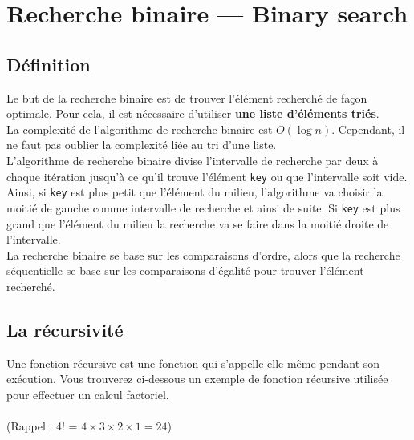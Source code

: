     \section{Recherche binaire — Binary search}
    
    \subsection{Définition}
    
    Le but de la recherche binaire est de trouver l'élément recherché de façon optimale. Pour cela, il est nécessaire d'utiliser \textbf{une liste d'éléments triés}.\\
    
    La complexité de l'algorithme de recherche binaire est $O(\log n)$. Cependant, il ne faut pas oublier la complexité liée au tri d'une liste.\\
    
    L'algorithme de recherche binaire divise l'intervalle de recherche par deux à chaque itération jusqu'à ce qu'il trouve l'élément \lstinline{key} ou que l'intervalle soit vide.\\
    
    Ainsi, si \lstinline{key} est plus petit que l'élément du milieu, l'algorithme va choisir la moitié de gauche comme intervalle de recherche et ainsi de suite. Si \lstinline{key} est plus grand que l'élément du milieu la recherche va se faire dans la moitié droite de l'intervalle.\\
    
    La recherche binaire se base sur les comparaisons d'ordre, alors que la recherche séquentielle se base sur les comparaisons d'égalité pour trouver l'élément recherché.\\
    
    \subsection{La récursivité}
    
    Une fonction récursive est une fonction qui s'appelle elle-même pendant son exécution. Vous trouverez ci-dessous un exemple de fonction récursive utilisée pour effectuer un calcul factoriel.\\\\
    (Rappel : 4! = $4 \times 3 \times 2 \times 1 = 24$)\\
    
    
    
